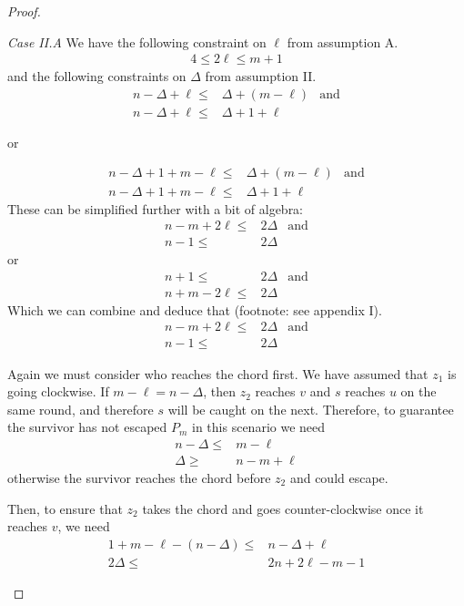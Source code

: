 \begin{proof}
\begin{proofpart}
  \textit{Case II.A} We have the following constraint on $\ell$ from
  assumption A.
  \begin{align*}
   4 \leq 2 \ell \leq m + 1
  \end{align*}
  and the following constraints on $\Delta$ from assumption II.
  \begin{align*}
   n - \Delta + \ell \leq & \Delta + (m - \ell) & \text{and} \\
   n - \Delta + \ell \leq & \Delta + 1 + \ell
  \end{align*}
  \begin{center}or\end{center}
  \begin{align*}
   n - \Delta + 1 + m - \ell \leq & \Delta + (m - \ell) & \text{and} \\
   n - \Delta + 1 + m - \ell \leq & \Delta + 1 + \ell
  \end{align*}
  These can be simplified further with a bit of algebra:
  \begin{align*}
   n-m +2\ell \leq & 2 \Delta & \text{and} \\
   n-1 \leq        & 2\Delta
  \end{align*}
  or
  \begin{align*}
   n + 1 \leq         & 2 \Delta & \text{and} \\
   n + m - 2\ell \leq & 2 \Delta
  \end{align*}
  Which we can combine and deduce that (footnote: see appendix I).
  \begin{align*}
   n -m + 2\ell \leq & 2 \Delta & \text{and} \\
   n-1 \leq          & 2 \Delta
  \end{align*}

  Again we must consider who reaches the chord first. We have assumed that $z_1$ is going clockwise. If $m - \ell = n - \Delta$, then $z_2$ reaches $v$ and $s$ reaches $u$ on the same round, and therefore $s$ will be caught on the next. Therefore, to guarantee the survivor has not escaped $P_m$ in this scenario we need
  \begin{align*}
   n - \Delta \leq & m - \ell     \\
   \Delta \geq     & n - m + \ell
  \end{align*}
  otherwise the survivor reaches the chord before $z_2$ and
  could escape.

  Then, to ensure that $z_2$ takes the chord and goes counter-clockwise once
  it reaches $v$, we need
  \begin{align*}
   1 + m - \ell - (n - \Delta) \leq & n - \Delta + \ell  \\
   2 \Delta \leq                    & 2n + 2\ell - m - 1
  \end{align*}


\end{proofpart}
\end{proof}
